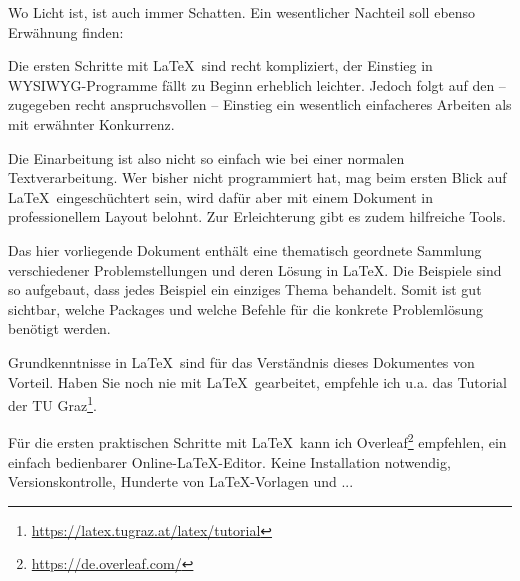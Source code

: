 Wo Licht ist, ist auch immer Schatten. Ein wesentlicher Nachteil soll ebenso Erwähnung finden: 

\begin{leftbar}
Die ersten Schritte mit \LaTeX~sind recht kompliziert, der Einstieg in WYSIWYG-Programme fällt zu Beginn erheblich leichter. Jedoch folgt auf den – zugegeben recht anspruchsvollen – Einstieg ein wesentlich einfacheres Arbeiten als mit erwähnter Konkurrenz.
\end{leftbar}

Die Einarbeitung ist also nicht so einfach wie bei einer normalen Textverarbeitung. Wer bisher nicht programmiert hat, mag beim ersten Blick auf \LaTeX~eingeschüchtert sein, wird dafür aber mit einem Dokument in professionellem Layout belohnt. Zur Erleichterung gibt es zudem hilfreiche Tools.

Das hier vorliegende Dokument enthält eine thematisch geordnete Sammlung verschiedener Problemstellungen und deren Lösung in \LaTeX. Die Beispiele sind so aufgebaut, dass jedes Beispiel ein einziges Thema behandelt. Somit ist gut sichtbar, welche Packages und welche Befehle für die konkrete Problemlösung benötigt werden. 

Grundkenntnisse in \LaTeX~sind für das Verständnis dieses Dokumentes von Vorteil. Haben Sie noch nie mit \LaTeX~gearbeitet, empfehle ich u.a. das Tutorial der TU Graz\footnote{\url{https://latex.tugraz.at/latex/tutorial}}.

Für die ersten praktischen Schritte mit \LaTeX~kann ich Overleaf\footnote{\url{https://de.overleaf.com/}} empfehlen, ein einfach bedienbarer Online-\LaTeX-Editor. Keine Installation notwendig, Versionskontrolle, Hunderte von \LaTeX-Vorlagen und ...
 